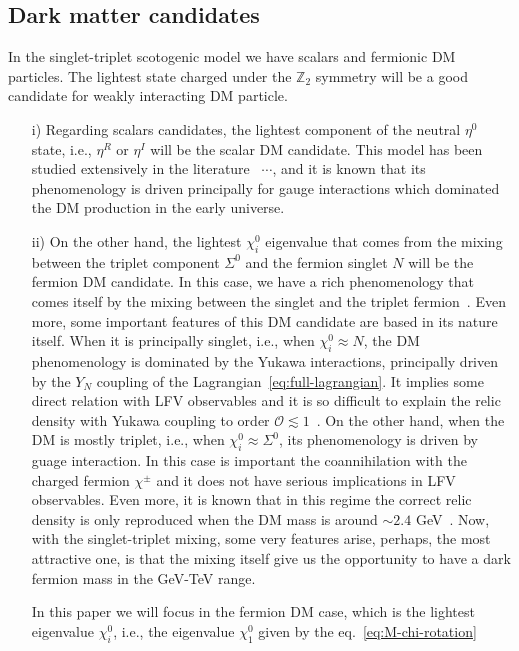 \documentclass[12pt,letterpaper]{article}
\begin{document}
\subsection{Dark matter candidates}
\label{sec:dark-matter}

In the singlet-triplet scotogenic model we have scalars and fermionic DM particles. The lightest state charged under the $\mathbb{Z}_2$ symmetry will be a good candidate for weakly interacting DM particle. 
\begin{enumerate}
\item[i)] Regarding scalars candidates, the lightest component of the neutral $\eta^0$ state, i.e., $\eta^R$ or $\eta^I$ will be the scalar DM candidate. 
This model has been studied extensively in the literature~\cite{Deshpande:1977rw} $\cdots$, and it is known that its phenomenology is driven principally for gauge interactions which dominated the DM production in the early universe. 
%
\item[ii)] On the other hand, the lightest $\chi_i^0$ eigenvalue that comes from the mixing between the triplet component $\Sigma^0$ and the fermion singlet $N$ will be the fermion DM candidate. In this case, we have a rich phenomenology that comes itself by the mixing between the singlet and the triplet fermion~\cite{Hirsch:2013ola, Rocha-Moran:2016enp, Merle:2016scw}. Even more, some important features of this DM candidate are based in its nature itself. When it is principally singlet, i.e., when $\chi_i^0\approx N$, the DM phenomenology is dominated by the Yukawa interactions, principally driven by the $Y_N$ coupling of the Lagrangian~\ref{eq:full-lagrangian}. It implies some direct relation with LFV observables and it is so difficult to explain the relic density with Yukawa coupling to order $\mathcal{O}\lesssim 1$~\cite{Ibarra:2016dlb}. 
On the other hand, when the DM is mostly triplet, i.e., when $\chi_i^0\approx \Sigma^0$, its phenomenology is driven by guage interaction. In this case is important the coannihilation with the charged fermion $\chi^{\pm}$ and it does not have serious implications in LFV observables. Even more, it is known that in this regime the correct relic density is only reproduced when the DM mass is around $\sim 2.4$ GeV~\cite{Ma:2008cu}. 
Now, with the singlet-triplet mixing, some very features arise, perhaps, the most attractive one, is that the mixing itself give us the opportunity to have a dark fermion mass in the GeV-TeV range.     

In this paper we will focus in the fermion DM case, which is the lightest eigenvalue $\chi_i^0$, i.e., the eigenvalue $\chi_1^0$ given by the eq.~\ref{eq:M-chi-rotation}
\end{enumerate}
\end{document}
